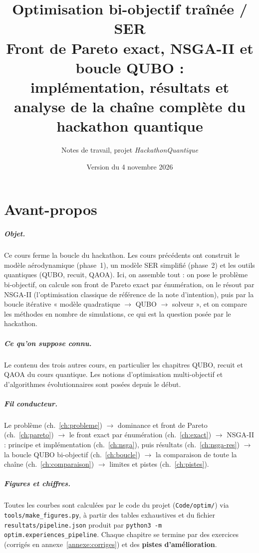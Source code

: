 \documentclass[11pt,a4paper]{report}
\title{\textbf{Optimisation bi-objectif traînée / SER}\\[0.4em]\large Front de Pareto exact, NSGA-II et boucle QUBO :\\ implémentation, résultats et analyse de la chaîne complète du hackathon quantique}
\author{Notes de travail, projet \emph{HackathonQuantique}}
\date{Version du 4 novembre 2026}
\begin{document}
\maketitle
{}

\chapter*{Avant-propos}
\paragraph{Objet.} Ce cours ferme la boucle du hackathon. Les cours précédents ont construit le modèle aérodynamique (phase~1), un modèle SER simplifié (phase~2) et les outils quantiques (QUBO, recuit, QAOA). Ici, on assemble tout : on pose le problème bi-objectif, on calcule son front de Pareto exact par énumération, on le résout par NSGA-II (l'optimisation classique de référence de la note d'intention), puis par la boucle itérative « modèle quadratique $\to$ QUBO $\to$ solveur », et on compare les méthodes en nombre de simulations, ce qui est la question posée par le hackathon.

\paragraph{Ce qu'on suppose connu.} Le contenu des trois autres cours, en particulier les chapitres QUBO, recuit et QAOA du cours quantique. Les notions d'optimisation multi-objectif et d'algorithmes évolutionnaires sont posées depuis le début.

\paragraph{Fil conducteur.} Le problème (ch.~\ref{ch:probleme}) $\to$ dominance et front de Pareto (ch.~\ref{ch:pareto}) $\to$ le front exact par énumération (ch.~\ref{ch:exact}) $\to$ NSGA-II : principe et implémentation (ch.~\ref{ch:nsga}), puis résultats (ch.~\ref{ch:nsga-res}) $\to$ la boucle QUBO bi-objectif (ch.~\ref{ch:boucle}) $\to$ la comparaison de toute la chaîne (ch.~\ref{ch:comparaison}) $\to$ limites et pistes (ch.~\ref{ch:pistes}).

\paragraph{Figures et chiffres.} Toutes les courbes sont calculées par le code du projet (\texttt{Code/optim/}) via \texttt{tools/make\_figures.py}, à partir des tables exhaustives et du fichier \texttt{resultats/pipeline.json} produit par \texttt{python3 -m optim.experiences\_pipeline}. Chaque chapitre se termine par des exercices (corrigés en annexe~\ref{annexe:corriges}) et des \textbf{pistes d'amélioration}.
\end{document}
